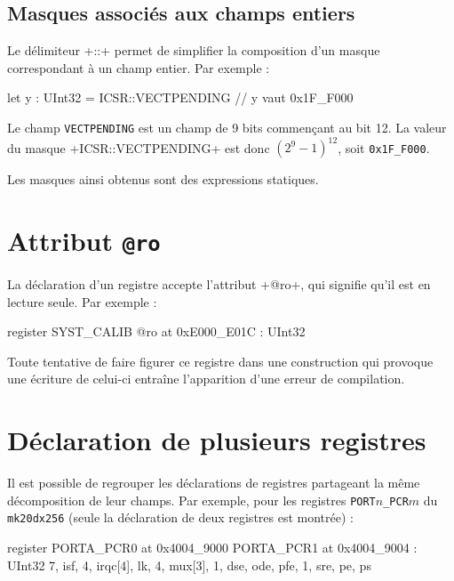 \subsection{Masques associés aux champs entiers}

Le délimiteur \plm+::+ permet de simplifier la composition d'un masque correspondant à un champ entier. Par exemple :

\begin{PLM}
let y : UInt32 = ICSR::VECTPENDING // y vaut 0x1F_F000
\end{PLM}

Le champ \texttt{VECTPENDING} est un champ de 9 bits commençant au bit 12. La valeur du masque \plm+ICSR::VECTPENDING+ est donc $(2^9 - 1)^{12}$, soit \texttt{0x1F\_F000}.

Les masques ainsi obtenus sont des expressions statiques.









\section{Attribut \texttt{@ro}}
La déclaration d'un registre accepte l'attribut \plm+@ro+, qui signifie qu'il est en lecture seule. Par exemple :
\begin{PLM}
register SYST_CALIB @ro at 0xE000_E01C : UInt32
\end{PLM}

Toute tentative de faire figurer ce registre dans une construction qui provoque une écriture de celui-ci entraîne l'apparition d'une erreur de compilation.


\section{Déclaration de plusieurs registres}

Il est possible de regrouper les déclarations de registres partageant la même décomposition de leur champs. Par exemple, pour les registres \texttt{PORT$n$\_PCR$m$} du \texttt{mk20dx256} (seule la déclaration de deux registres est montrée) :

\begin{PLM}
register
  PORTA_PCR0 at 0x4004_9000
  PORTA_PCR1 at 0x4004_9004
: UInt32 {
  7, isf, 4, irqc[4], lk, 4, mux[3], 1, dse, ode, pfe, 1, sre, pe, ps
}
\end{PLM}

